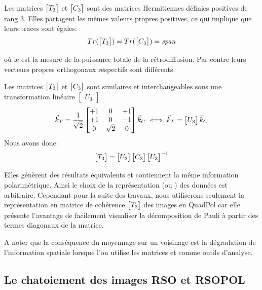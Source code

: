 \vspace{10pt}

 Les matrices $\begin{bmatrix} T_3 \end{bmatrix}$ et $\begin{bmatrix} C_3 \end{bmatrix}$ sont des matrices Hermitiennes définies positives de rang 3.  Elles partagent les mêmes valeurs propres positives, ce qui implique que leurs traces sont égales:
\begin{equation}
    Tr(\begin{bmatrix} T_3 \end{bmatrix}) = Tr(\begin{bmatrix} C_3 \end{bmatrix}) = \textit{span}
\end{equation}  

\vspace{10pt}

où le \itspan est la mesure de la puissance totale de la rétrodiffusion. Par contre leurs vecteurs propres orthogonaux respectifs sont différents.
 
 Les matrices $\begin{bmatrix} T_3 \end{bmatrix}$ et $\begin{bmatrix} C_3 \end{bmatrix}$  sont similaires et interchangeables sous une transformation linéaire $\begin{bmatrix}U_3\end{bmatrix}$.
  \begin{equation}
  \Vec{k}_T = \frac{1}{\sqrt{2}} 
 \begin{bmatrix}
  +1 & 0 & +1 \\
  +1 & 0 &-1 \\
  0 & \sqrt{2} & 0
  \end{bmatrix} \Vec{k}_C \iff  \Vec{k}_T = \begin{bmatrix} U_3 \end{bmatrix}  \Vec{k}_C
  \end{equation}
  Nous avons donc:
\begin{equation}
    \begin{bmatrix} T_3 \end{bmatrix}= \begin{bmatrix} U_3 \end{bmatrix}   \begin{bmatrix} C_3 \end{bmatrix}   \begin{bmatrix} U_3 \end{bmatrix}^{-1}
\end{equation}

\vspace{10pt}

 Elles génèrent des résultats équivalents et contiennent la même information polarimétrique.  Ainsi le choix de la représentation (\matcoh ou \matcov) des données est arbitraire.  Cependant pour la suite des travaux,  nous utiliserons seulement la représentation en matrice de cohérence $\begin{bmatrix} T_3 \end{bmatrix}$ des images en QuadPol car elle présente l’avantage de facilement visualiser la décomposition de Pauli à partir des termes diagonaux de la matrice.
 
 A noter que la conséquence du moyennage sur un voisinage est la dégradation de l'information spatiale lorsque l'on utilise les matrices \matcoh et \matcov comme outils d'analyse. 
 
\subsection{Le chatoiement des images RSO et RSOPOL} \label{sec:speckle}

